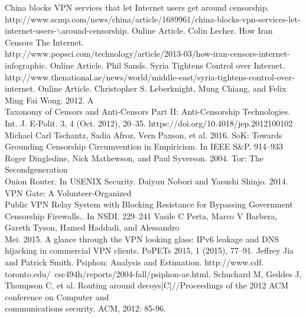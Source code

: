 \documentclass[conference]{IEEEtran}
\begin{document}
\begin{thebibliography}{00}
 China blocks VPN services that let Internet users get around censorship.\\ http://www.scmp.com/news/china/article/1689961/china-blocks-vpn-services-let-internet-users-$\backslash$around-censorship. Online Article.
 Colin Lecher. How Iran Censors The Internet.\\ http://www.popsci.com/technology/article/2013-03/how-iran-censors-internet-infographic. Online Article.
 Phil Sands. Syria Tightens Control over Internet.\\ http://www.thenational.ae/news/world/middle-east/syria-tightens-control-over-internet. Online Article.
 Christopher S. Leberknight, Mung Chiang, and Felix Ming Fai Wong. 2012. A\\
Taxonomy of Censors and Anti-Censors Part II: Anti-Censorship Technologies.\\
Int. J. E-Polit. 3, 4 (Oct. 2012), 20–35. https://doi.org/10.4018/jep.2012100102
Michael Carl Tschantz, Sadia Afroz, Vern Paxson, et al. 2016. SoK: Towards\\
Grounding Censorship Circumvention in Empiricism. In IEEE S\&P. 914–933
 Roger Dingledine, Nick Mathewson, and Paul Syverson. 2004. Tor: The Secondgeneration\\
Onion Router. In USENIX Security.
 Daiyuu Nobori and Yasushi Shinjo. 2014. VPN Gate: A Volunteer-Organized\\
Public VPN Relay System with Blocking Resistance for Bypassing Government\\
Censorship Firewalls.. In NSDI. 229–241
 Vasile C Perta, Marco V Barbera, Gareth Tyson, Hamed Haddadi, and Alessandro\\
Mei. 2015. A glance through the VPN looking glass: IPv6 leakage and DNS\\
hijacking in commercial VPN clients. PoPETs 2015, 1 (2015), 77–91.
 Jeffrey Jia and Patrick Smith. Psiphon: Analysis and Estimation. http://www.cdf.\\
toronto.edu/~csc494h/reports/2004-fall/psiphon-ae.html.
 Schuchard M, Geddes J, Thompson C, et al. Routing around decoys[C]//Proceedings of the 2012 ACM conference on Computer and\\ communications security. ACM, 2012: 85-96.

\end{thebibliography}
\end{document}
